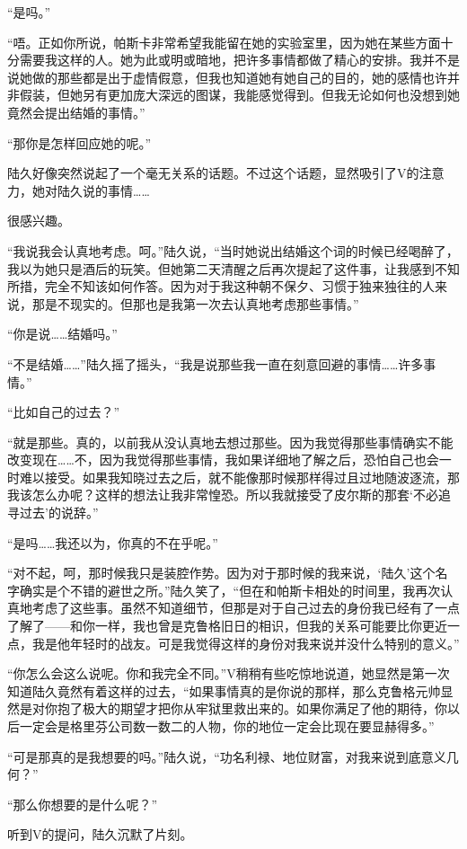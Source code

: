 “是吗。”

“唔。正如你所说，帕斯卡非常希望我能留在她的实验室里，因为她在某些方面十分需要我这样的人。她为此或明或暗地，把许多事情都做了精心的安排。我并不是说她做的那些都是出于虚情假意，但我也知道她有她自己的目的，她的感情也许并非假装，但她另有更加庞大深远的图谋，我能感觉得到。但我无论如何也没想到她竟然会提出结婚的事情。”

“那你是怎样回应她的呢。” 

陆久好像突然说起了一个毫无关系的话题。不过这个话题，显然吸引了V的注意力，她对陆久说的事情……

很感兴趣。

“我说我会认真地考虑。呵。”陆久说，“当时她说出结婚这个词的时候已经喝醉了，我以为她只是酒后的玩笑。但她第二天清醒之后再次提起了这件事，让我感到不知所措，完全不知该如何作答。因为对于我这种朝不保夕、习惯于独来独往的人来说，那是不现实的。但那也是我第一次去认真地考虑那些事情。” 

“你是说……结婚吗。”

“不是结婚……”陆久摇了摇头，“我是说那些我一直在刻意回避的事情……许多事情。”

“比如自己的过去？”

“就是那些。真的，以前我从没认真地去想过那些。因为我觉得那些事情确实不能改变现在……不，因为我觉得那些事情，我如果详细地了解之后，恐怕自己也会一时难以接受。如果我知晓过去之后，就不能像那时候那样得过且过地随波逐流，那我该怎么办呢？这样的想法让我非常惶恐。所以我就接受了皮尔斯的那套‘不必追寻过去’的说辞。”

“是吗……我还以为，你真的不在乎呢。”

“对不起，呵，那时候我只是装腔作势。因为对于那时候的我来说，‘陆久’这个名字确实是个不错的避世之所。”陆久笑了，“但在和帕斯卡相处的时间里，我再次认真地考虑了这些事。虽然不知道细节，但那是对于自己过去的身份我已经有了一点了解了——和你一样，我也曾是克鲁格旧日的相识，但我的关系可能要比你更近一点，我是他年轻时的战友。可是我觉得这样的身份对我来说并没什么特别的意义。”

“你怎么会这么说呢。你和我完全不同。”V稍稍有些吃惊地说道，她显然是第一次知道陆久竟然有着这样的过去，“如果事情真的是你说的那样，那么克鲁格元帅显然是对你抱了极大的期望才把你从牢狱里救出来的。如果你满足了他的期待，你以后一定会是格里芬公司数一数二的人物，你的地位一定会比现在要显赫得多。”

“可是那真的是我想要的吗。”陆久说，“功名利禄、地位财富，对我来说到底意义几何？”

“那么你想要的是什么呢？”

听到V的提问，陆久沉默了片刻。

